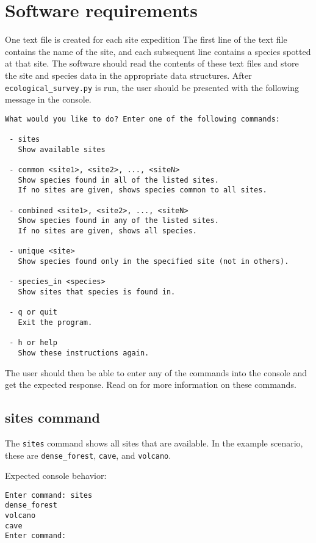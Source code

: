 \documentclass[12pt,letterpaper]{article}
\begin{document}
\section{Software requirements}
One text file is created for each site expedition The first line of the text file contains the name of the site, and each subsequent line contains a species spotted at that site. The software should read the contents of these text files and store the site and species data in the appropriate data structures. After \texttt{ecological\_survey.py} is run, the user should be presented with the following message in the console.

\begin{lstlisting}
What would you like to do? Enter one of the following commands:

 - sites
   Show available sites

 - common <site1>, <site2>, ..., <siteN>  
   Show species found in all of the listed sites.  
   If no sites are given, shows species common to all sites.

 - combined <site1>, <site2>, ..., <siteN>  
   Show species found in any of the listed sites.  
   If no sites are given, shows all species.

 - unique <site>  
   Show species found only in the specified site (not in others).

 - species_in <species>
   Show sites that species is found in.

 - q or quit  
   Exit the program.

 - h or help  
   Show these instructions again.

\end{lstlisting}

The user should then be able to enter any of the commands into the console and get the expected response. Read on for more information on these commands.

\subsection{sites command}
The \texttt{sites} command shows all sites that are available. In the example scenario, these are \texttt{dense\_forest}, \texttt{cave}, and \texttt{volcano}.

Expected console behavior:
\begin{lstlisting}
Enter command: sites
dense_forest
volcano
cave
Enter command: 
\end{lstlisting}
\end{document}
